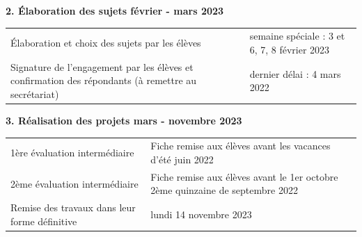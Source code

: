 \documentclass[
  10pt,
  french,
  a5paper,
  openany]{book}
\begin{document}

\textbf{2. Élaboration des sujets \hfill février - mars 2023}

\begin{longtable}[]{@{}ll@{}}
\toprule
\endhead
\begin{minipage}[t]{0.65\columnwidth}\raggedright
Élaboration et choix des sujets par les élèves\strut
\end{minipage} & \begin{minipage}[t]{0.29\columnwidth}\raggedright
semaine spéciale : 3 et 6, 7, 8 février 2023\strut
\end{minipage}\tabularnewline
\begin{minipage}[t]{0.65\columnwidth}\raggedright
Signature de l'engagement par les élèves et confirmation des répondants (à remettre au secrétariat)\strut
\end{minipage} & \begin{minipage}[t]{0.29\columnwidth}\raggedright
dernier délai : 4 mars 2022\strut
\end{minipage}\tabularnewline
\bottomrule
\end{longtable}


\clearpage


\textbf{3. Réalisation des projets \hfill mars - novembre 2023}

\begin{longtable}[]{@{}ll@{}}
\toprule
\endhead
\begin{minipage}[t]{0.35\columnwidth}\raggedright
1ère évaluation intermédiaire\strut
\end{minipage} & \begin{minipage}[t]{0.59\columnwidth}\raggedright
Fiche remise aux élèves avant les vacances d'été juin 2022\strut
\end{minipage}\tabularnewline
\begin{minipage}[t]{0.35\columnwidth}\raggedright
2ème évaluation intermédiaire\strut
\end{minipage} & \begin{minipage}[t]{0.59\columnwidth}\raggedright
Fiche remise aux élèves avant le 1er octobre 2ème quinzaine de septembre 2022\strut
\end{minipage}\tabularnewline
\begin{minipage}[t]{0.35\columnwidth}\raggedright
Remise des travaux dans leur forme définitive\strut
\end{minipage} & \begin{minipage}[t]{0.59\columnwidth}\raggedright
lundi 14 novembre 2023\strut
\end{minipage}\tabularnewline
\bottomrule
\end{longtable}
\end{document}
